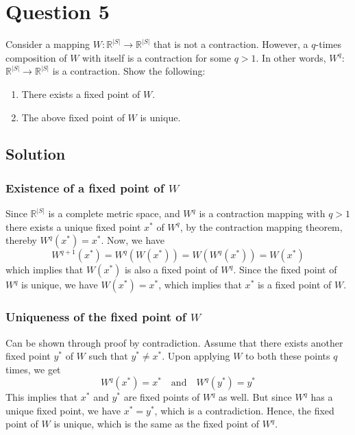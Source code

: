 \section*{Question 5}

Consider a mapping \( W: \mathbb{R}^{|S|} \rightarrow \mathbb{R}^{|S|} \) that is not a contraction.
However, a \( q \)-times composition of \( W \) with itself is a contraction for some \( q>1 \).
In other words, \( W^{q} \): \( \mathbb{R}^{|S|} \rightarrow \mathbb{R}^{|S|} \) is a contraction.
Show the following:
\begin{enumerate}[noitemsep]
    \item There exists a fixed point of \( W \).
    \item The above fixed point of \( W \) is unique.
\end{enumerate}

\subsection*{Solution}

\subsubsection*{Existence of a fixed point of \( W \)}

Since \( \mathbb{R}^{|S|} \) is a complete metric space, and \( W^{q} \) is a contraction mapping with \( q > 1 \) there exists a unique fixed point \( x^{*} \) of \( W^{q} \), by the contraction mapping theorem, thereby \( W^{q}(x^{*}) = x^{*} \).
Now, we have
\[
    W^{q+1}(x^{*}) = W^{q}(W(x^{*})) = W(W^{q}(x^{*})) = W(x^{*})
\]
which implies that \( W(x^{*}) \) is also a fixed point of \( W^{q} \).
Since the fixed point of \( W^{q} \) is unique, we have \( W(x^{*}) = x^{*} \), which implies that \( x^{*} \) is a fixed point of \( W \).

\subsubsection*{Uniqueness of the fixed point of \( W \)}

Can be shown through proof by contradiction.
Assume that there exists another fixed point \( y^{*} \) of \( W \) such that \( y^{*} \neq x^{*} \).
Upon applying \( W \) to both these points \( q \) times, we get
\[
    W^{q}(x^{*}) = x^{*} \quad \text{and} \quad W^{q}(y^{*}) = y^{*}
\]
This implies that \( x^{*} \) and \( y^{*} \) are fixed points of \( W^{q} \) as well.
But since \( W^{q} \) has a unique fixed point, we have \( x^{*} = y^{*} \), which is a contradiction.
Hence, the fixed point of \( W \) is unique, which is the same as the fixed point of \( W^{q} \).
